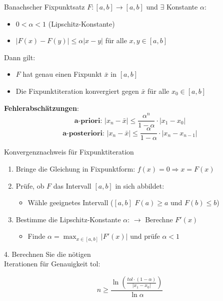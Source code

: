 \begin{lemma}{Banachscher Fixpunktsatz}
$F:[a,b] \rightarrow [a,b]$ und $\exists$ Konstante $\alpha$:
\begin{itemize}
    \item $0 < \alpha < 1$ (Lipschitz-Konstante)
    \item $|F(x)-F(y)| \leq \alpha|x-y|$ für alle $x,y \in [a,b]$
\end{itemize}
\vspace{2mm}


\begin{minipage}[t]{0.35\textwidth}
    Dann gilt:
\begin{itemize}
    \item $F$ hat genau einen Fixpunkt $\bar{x}$ in $[a,b]$
    \item Die Fixpunktiteration konvergiert gegen $\bar{x}$ für alle $x_0 \in [a,b]$
\end{itemize}
\end{minipage}
\hspace{2mm}
\begin{minipage}[t]{0.55\textwidth}
    \textbf{Fehlerabschätzungen}:
    \vspace{-2mm}\\
    $$\textbf{a-priori: } |x_n-\bar{x}| \leq \frac{\alpha^n}{1-\alpha} \cdot |x_1-x_0|$$
    $$\textbf{a-posteriori: } |x_n-\bar{x}| \leq \frac{\alpha}{1-\alpha} \cdot |x_n-x_{n-1}|$$
\end{minipage}
\end{lemma}

\begin{KR}{Konvergenznachweis für Fixpunktiteration}
\begin{enumerate}
    \item Bringe die Gleichung in Fixpunktform: $f(x)=0 \Rightarrow x = F(x)$
    \item Prüfe, ob $F$ das Intervall $[a,b]$ in sich abbildet:
    \begin{itemize}
        \item Wähle geeignetes Intervall ($[a,b]$ $F(a) \geq a$ und $F(b) \leq b$)
    \end{itemize}
    \item Bestimme die Lipschitz-Konstante $\alpha$: $\rightarrow$ Berechne $F'(x)$
    \begin{itemize}
        \item Finde $\alpha = \max_{x \in [a,b]} |F'(x)|$ und prüfe $\alpha < 1$
    \end{itemize}
\end{enumerate}

\begin{minipage}[t]{0.5\textwidth}
    4. Berechnen Sie die nötigen \\Iterationen für Genauigkeit tol:
\end{minipage}
\begin{minipage}[t]{0.4\textwidth}
    \vspace{-3mm}
$$n \geq \frac{\ln(\frac{tol \cdot (1-\alpha)}{|x_1-x_0|})}{\ln \alpha}$$
\end{minipage}
\end{KR}

